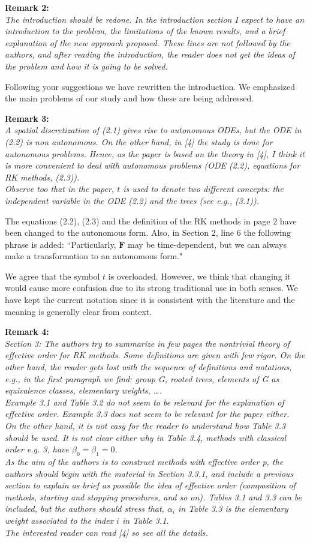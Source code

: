 \documentclass[12pt]{article}
\newcommand{\remark}[2]{\vspace{25pt} \noindent \textbf{Remark #1:\newline} \textit{#2}\vspace{15pt}}
\renewcommand{\newline}{\vspace{15pt}\\}
\begin{document}
\remark{2}{
The introduction should be redone. 
In the introduction section I expect to have an introduction to the problem, the 
limitations of the known results, and a brief explanation of the new approach proposed. 
These lines are not followed by the authors, and after reading the introduction, the 
reader does not get the ideas of the problem and how it is going to be solved.}

Following your suggestions we have rewritten the introduction. 
We emphasized the main problems of our study and how these are being addressed.

\remark{3}{
A spatial discretization of (2.1) gives rise to autonomous ODEs, but the ODE in (2.2) is
non autonomous. 
On the other hand, in [4] the study is done for autonomous problems.
Hence, as the paper is based on the theory in [4], I think it is more convenient to deal
with autonomous problems (ODE (2.2), equations for RK methods, (2.3)).
\newline
Observe too that in the paper, $t$ is used to denote two different concepts: the independent
variable in the ODE (2.2) and the trees (see e.g., (3.1)).}

The equations (2.2), (2.3) and the definition of the RK methods in page 2 have been
changed to the autonomous form. 
Also, in Section 2, line 6 the following phrase is added:
``Particularly, $\bm{F}$ may be time-dependent, but we can always make a transformation 
to an autonomous form."

We agree that the symbol $t$ is overloaded.  However, we think that changing it would cause more
confusion due to its strong traditional use in both senses.  We have kept the current notation since
it is consistent with the literature and the meaning is generally clear from context.

\pagebreak

\remark{4}{
Section 3: The authors try to summarize in few pages the nontrivial theory of effective
order for RK methods. 
Some definitions are given with few rigor. 
On the other hand, the reader gets lost with the sequence of definitions and notations, 
e.g., in the first paragraph we find: group G, rooted trees, elements of G as equivalence 
classes, elementary weights, \dots.
\newline
Example 3.1 and Table 3.2 do not seem to be relevant for the explanation of effective
order. 
Example 3.3 does not seem to be relevant for the paper either.
\newline
On the other hand, it is not easy for the reader to understand how Table 3.3 should be
used. It is not clear either why in Table 3.4, methods with classical order e.g. 3, have
$\beta_0 = \beta_1 = 0$. \\
As the aim of the authors is to construct methods with effective order p, the authors
should begin with the material in Section 3.3.1, and include a previous section to explain
as brief as possible the idea of effective order (composition of methods, starting and
stopping procedures, and so on).
Tables 3.1 and 3.3 can be included, but the authors should stress that, $\alpha_i$ in 
Table 3.3 is the elementary weight associated to the index $i$ in Table 3.1.
\newline
The interested reader can read [4] so see all the details.}
\end{document}
